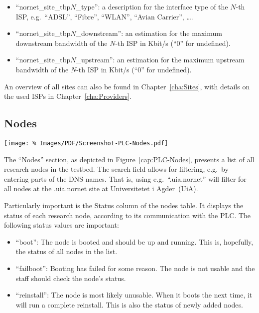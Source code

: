 \begin{itemize}
 \item ``nornet\_site\_tbp$N$\_type'': a description for the interface type of the $N$-th ISP, e.g.\ ``ADSL'', ``Fibre'', ``WLAN'', ``Avian Carrier'', \ldots.

 \item ``nornet\_site\_tbp$N$\_downstream'': an estimation for the maximum downstream bandwidth of the $N$-th ISP in Kbit/s (``0'' for undefined).
 
 \item ``nornet\_site\_tbp$N$\_upstream'': an estimation for the maximum upstream bandwidth of the $N$-th ISP in Kbit/s (``0'' for undefined).

\end{itemize}
 
An overview of all  sites can also be found in Chapter~\ref{cha:Sites}, with details on the used ISPs in Chapter~\ref{cha:Providers}.


\subsection{Nodes}
\label{sub:Nodes}

\begin{figure*}
\begin{center}
\texttt{[image: \%
   Images/PDF/Screenshot-PLC-Nodes.pdf]}
\end{center}
\caption{Nodes}
\label{cap:PLC-Nodes}
\end{figure*}

The ``Nodes'' section, as depicted in Figure~\ref{cap:PLC-Nodes}, presents a list of all research nodes in the testbed. The search field allows for filtering, e.g.\ by entering parts of the DNS names. That is, using e.g.\ ``.uia.nornet'' will filter for all nodes at the .uia.nornet site at \foreignlanguage{norsk}{Universitetet i Agder~(UiA)}.

Particularly important is the Status column of the nodes table. It displays the status of each research node, according to its communication with the PLC. The following status values are important:
\begin{itemize}
 \item ``boot'': The node is booted and should be up and running. This is, hopefully, the status of all nodes in the list.
 \item ``failboot'': Booting has failed for some reason. The node is not usable and the  staff should check the node's status.
 \item ``reinstall'': The node is most likely unusable. When it boots the next time, it will run a complete reinstall. This is also the status of newly added nodes.
\end{itemize}



